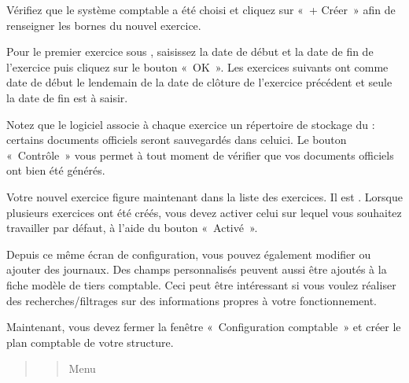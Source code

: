 \documentclass[a4paper,10pt,oneside,french]{sphinxmanual}
\begin{document}
Vérifiez que le système comptable a été choisi et cliquez sur « + Créer » afin de renseigner les bornes du nouvel exercice.
\begin{quote}

\noindent{}
\end{quote}

Pour le premier exercice sous , saisissez la date de début et la date de fin de l’exercice puis cliquez sur le bouton « OK ». Les exercices suivants ont comme date de début le lendemain de la date de clôture de l’exercice précédent et seule la date de fin est à saisir.

Notez que le logiciel associe à chaque exercice un répertoire de stockage du  : certains documents
officiels seront sauvegardés dans celui\sphinxhyphen{}ci. Le bouton « Contrôle » vous permet à tout moment de  vérifier que vos documents officiels ont bien été générés.

Votre nouvel exercice figure maintenant dans la liste des exercices. Il est \sphinxstylestrong{{[}en création{]}}. Lorsque plusieurs exercices ont été créés, vous devez activer celui sur lequel vous souhaitez travailler par défaut, à l’aide du bouton « Activé ».
\begin{quote}

\end{quote}

Depuis ce même écran de configuration, vous pouvez également modifier ou ajouter des journaux. Des champs personnalisés peuvent aussi être ajoutés à la fiche modèle de tiers comptable. Ceci peut être intéressant si vous voulez réaliser des recherches/filtrages sur des informations propres à votre fonctionnement.

Maintenant, vous devez fermer la fenêtre « Configuration comptable » et créer le plan comptable de votre structure.
\begin{quote}
\begin{quote}

Menu 
\end{quote}
\end{quote}
\end{document}
